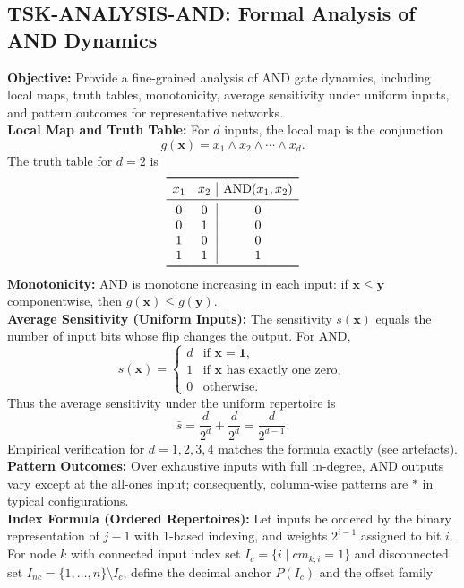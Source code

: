 \documentclass[11pt]{article}
\begin{document}
\subsection{TSK-ANALYSIS-AND: Formal Analysis of AND Dynamics}
\textbf{Objective:} Provide a fine-grained analysis of AND gate dynamics, including local maps, truth tables, monotonicity, average sensitivity under uniform inputs, and pattern outcomes for representative networks.\\
\textbf{Local Map and Truth Table:} For \(d\) inputs, the local map is the conjunction
\[
g(\mathbf{x}) = x_1 \land x_2 \land \cdots \land x_d.
\]
The truth table for \(d=2\) is
\[
\begin{array}{cc|c}
\toprule
 x_1 & x_2 & \mathrm{AND}(x_1,x_2) \\
\midrule
 0 & 0 & 0 \\
 0 & 1 & 0 \\
 1 & 0 & 0 \\
 1 & 1 & 1 \\
\bottomrule
\end{array}
\]
\textbf{Monotonicity:} AND is monotone increasing in each input: if \(\mathbf{x}\leq \mathbf{y}\) componentwise, then \(g(\mathbf{x})\leq g(\mathbf{y})\).\\
\textbf{Average Sensitivity (Uniform Inputs):} The sensitivity \(s(\mathbf{x})\) equals the number of input bits whose flip changes the output. For AND,
\[
s(\mathbf{x}) = \begin{cases}
 d & \text{if } \mathbf{x}=\mathbf{1},\\
 1 & \text{if } \mathbf{x} \text{ has exactly one zero},\\
 0 & \text{otherwise.}
\end{cases}
\]
Thus the average sensitivity under the uniform repertoire is
\[
\bar{s} = \frac{d}{2^d} + \frac{d}{2^d} = \frac{d}{2^{d-1}}.
\]
Empirical verification for \(d=1,2,3,4\) matches the formula exactly (see artefacts).\\
\textbf{Pattern Outcomes:} Over exhaustive inputs with full in-degree, AND outputs vary except at the all-ones input; consequently, column-wise patterns are \(*\) in typical configurations.\\
\textbf{Index Formula (Ordered Repertoires):} Let inputs be ordered by the binary representation of \(j-1\) with 1-based indexing, and weights \(2^{i-1}\) assigned to bit \(i\). For node \(k\) with connected input index set \(I_c=\{i\mid cm_{k,i}=1\}\) and disconnected set \(I_{nc}=\{1,\dots,n\}\setminus I_c\), define the decimal anchor \(P(I_c)\) and the offset family
\end{document}
